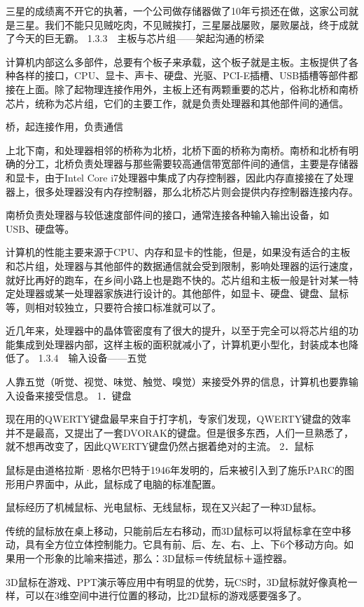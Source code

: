 \documentclass[12pt,UTF8]{ctexbook}
\begin{document}
三星的成绩离不开它的执著，一个公司做存储器做了10年亏损还在做，这家公司就是三星。我们不能只见贼吃肉，不见贼挨打，三星屡战屡败，屡败屡战，终于成就了今天的巨无霸。
1.3.3　主板与芯片组——架起沟通的桥梁

计算机内部这么多部件，总要有个板子来承载，这个板子就是主板。主板提供了各种各样的接口，CPU、显卡、声卡、硬盘、光驱、PCI-E插槽、USB插槽等部件都接在上面。除了起物理连接作用外，主板上还有两颗重要的芯片，俗称北桥和南桥芯片，统称为芯片组，它们的主要工作，就是负责处理器和其他部件间的通信。

桥，起连接作用，负责通信

上北下南，和处理器相邻的桥称为北桥，北桥下面的桥称为南桥。南桥和北桥有明确的分工，北桥负责处理器与那些需要较高通信带宽部件间的通信，主要是存储器和显卡，由于Intel Core i7处理器中集成了内存控制器，因此内存直接接在了处理器上，很多处理器没有内存控制器，那么北桥芯片则会提供内存控制器连接内存。

南桥负责处理器与较低速度部件间的接口，通常连接各种输入输出设备，如USB、硬盘等。

计算机的性能主要来源于CPU、内存和显卡的性能，但是，如果没有适合的主板和芯片组，处理器与其他部件的数据通信就会受到限制，影响处理器的运行速度，就好比再好的跑车，在乡间小路上也是跑不快的。芯片组和主板一般是针对某一特定处理器或某一处理器家族进行设计的。其他部件，如显卡、硬盘、键盘、鼠标等，则相对较独立，只要符合接口标准就可以了。

近几年来，处理器中的晶体管密度有了很大的提升，以至于完全可以将芯片组的功能集成到处理器内部，这样主板的面积就减小了，计算机更小型化，封装成本也降低了。
1.3.4　输入设备——五觉

人靠五觉（听觉、视觉、味觉、触觉、嗅觉）来接受外界的信息，计算机也要靠输入设备来接受信息。
1．键盘

现在用的QWERTY键盘最早来自于打字机，专家们发现，QWERTY键盘的效率并不是最高，又提出了一套DVORAK的键盘。但是很多东西，人们一旦熟悉了，就不想再改变了，因此QWERTY键盘仍然占据着绝对的主流。
2．鼠标

鼠标是由道格拉斯·恩格尔巴特于1946年发明的，后来被引入到了施乐PARC的图形用户界面中，从此，鼠标成了电脑的标准配置。

鼠标经历了机械鼠标、光电鼠标、无线鼠标，现在又兴起了一种3D鼠标。

传统的鼠标放在桌上移动，只能前后左右移动，而3D鼠标可以将鼠标拿在空中移动，具有全方位立体控制能力。它具有前、后、左、右、上、下6个移动方向。如果用一个形象的比喻来描述，那么：3D鼠标＝传统鼠标＋遥控器。

3D鼠标在游戏、PPT演示等应用中有明显的优势，玩CS时，3D鼠标就好像真枪一样，可以在3维空间中进行位置的移动，比2D鼠标的游戏感要强多了。
\end{document}
